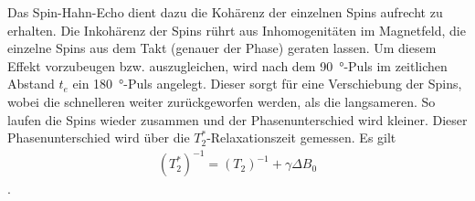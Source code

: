 \documentclass[../main.tex]{subfiles}
\begin{document}
    Das Spin-Hahn-Echo dient dazu die Kohärenz der einzelnen Spins aufrecht zu erhalten. Die Inkohärenz der Spins rührt aus Inhomogenitäten im Magnetfeld, die einzelne Spins aus dem \glqq{}Takt\grqq{} (genauer der Phase) geraten lassen. Um diesem Effekt vorzubeugen bzw. auszugleichen, wird nach dem \SI{90}{\degree}-Puls im zeitlichen Abstand $t_{e}$ ein \SI{180}{\degree}-Puls angelegt. Dieser sorgt für eine Verschiebung der Spins, wobei die schnelleren weiter zurückgeworfen werden, als die langsameren. So laufen die Spins wieder zusammen und der Phasenunterschied wird kleiner. Dieser Phasenunterschied wird über die $T_{2}^{*}$-Relaxationszeit gemessen. Es gilt 
    \begin{align}
        (T_{2}^{*})^{-1} = (T_{2})^{-1} + \gamma \Delta B_{0}
    \end{align}.
    


    
    
\end{document}
